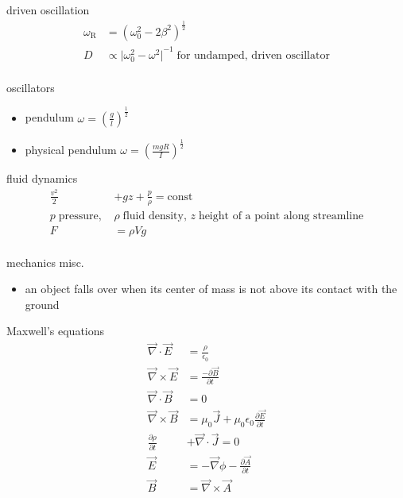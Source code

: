 \documentclass[avery5388, frame, grid]{flashcards}
\begin{document}
\begin{flashcard}{driven oscillation}
  {
    \begin{align*}
      \omega_{\textrm{R}} &= (\omega_{0}^{2} - 2 \beta^{2})^{\frac{1}{2}}\\
      D &\propto {\vert \omega_{0}^{2} - \omega^{2} \vert}^{-1} \; \textrm{for undamped, driven oscillator}\\
    \end{align*}
  }
\end{flashcard}

\begin{flashcard}{oscillators}
  {
    \begin{itemize}
    \item pendulum $\omega = (\frac{g}{l})^{\frac{1}{2}}$
    \item physical pendulum $\omega = (\frac{mgR}{I})^{\frac{1}{2}}$
    \end{itemize}
  }
\end{flashcard}

\begin{flashcard}{fluid dynamics}
  {
    \begin{align*}
      \frac{v^2}{2} &+ g z + \frac{p}{\rho} = \textrm{const}\\
      p \; \textrm{pressure, } &\rho \; \textrm{fluid density, } z \; \textrm{height of a point along streamline}\\
      F & = \rho V g\\
    \end{align*}
  }
\end{flashcard}

\begin{flashcard}{mechanics misc.}
  {
    \begin{itemize}
      \item an object falls over when its center of mass is not above its contact with the ground
    \end{itemize}
  }
\end{flashcard}


\begin{flashcard}{Maxwell's equations}
  {
    \begin{align*}
      \vec{\nabla} \cdot \vec{E} &= \frac{\rho}{\epsilon_{0}}\\
      \vec{\nabla} \times \vec{E} &= \frac{- \partial \vec{B}}{\partial t}\\
      \vec{\nabla} \cdot \vec{B} &= 0\\
      \vec{\nabla} \times \vec{B} &= \mu_{0} \vec{J} + \mu_{0} \epsilon_{0} \frac{\partial \vec{E}}{\partial t}\\
      \frac{\partial \rho}{\partial t} &+ \vec{\nabla} \cdot \vec{J} = 0\\
      \vec{E} &= - \vec{\nabla} \phi - \frac{\partial \vec{A}}{\partial t}\\
      \vec{B} &= \vec{\nabla} \times \vec{A}\\
    \end{align*}
  }
\end{flashcard}
\end{document}
